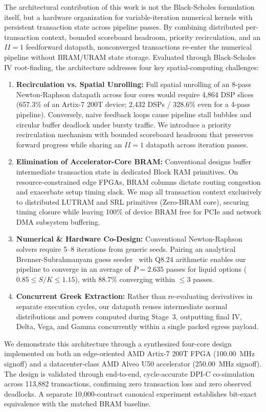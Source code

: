 \documentclass[sigconf,anonymous,review]{acmart}
\begin{document}
The architectural contribution of this work is not the Black-Scholes formulation itself, but a hardware organization for variable-iteration numerical kernels with persistent transaction state across pipeline passes. By combining distributed per-transaction context, bounded scoreboard headroom, priority recirculation, and an $II=1$ feedforward datapath, nonconverged transactions re-enter the numerical pipeline without BRAM/URAM state storage. Evaluated through Black-Scholes IV root-finding, the architecture addresses four key spatial-computing challenges:
\begin{enumerate}
    \item \textbf{Recirculation vs. Spatial Unrolling:} Full spatial unrolling of an 8-pass Newton-Raphson datapath across four cores would require 4,864 DSP slices (657.3\% of an Artix-7 200T device; 2,432 DSPs / 328.6\% even for a 4-pass pipeline). Conversely, naive feedback loops cause pipeline stall bubbles and circular buffer deadlock under bursty traffic. We introduce a priority recirculation mechanism with bounded scoreboard headroom that preserves forward progress while sharing an $II=1$ datapath across iteration passes.
    \item \textbf{Elimination of Accelerator-Core BRAM:} Conventional designs buffer intermediate transaction state in dedicated Block RAM primitives. On resource-constrained edge FPGAs, BRAM columns dictate routing congestion and exacerbate setup timing slack. We map all transaction context exclusively to distributed LUTRAM and SRL primitives (Zero-BRAM core), securing timing closure while leaving 100\% of device BRAM free for PCIe and network DMA subsystem buffering.
    \item \textbf{Numerical \& Hardware Co-Design:} Conventional Newton-Raphson solvers require 5--8 iterations from generic seeds. Pairing an analytical Brenner-Subrahmanyam guess seeder~\cite{brenner1988simple} with Q8.24 arithmetic enables our pipeline to converge in an average of $\bar{P} = 2.635$ passes for liquid options ($0.85 \le S/K \le 1.15$), with 88.7\% converging within $\le 3$ passes.
    \item \textbf{Concurrent Greek Extraction:} Rather than re-evaluating derivatives in separate execution cycles, our datapath reuses intermediate normal distributions and powers computed during Stage~3, outputting final IV, Delta, Vega, and Gamma concurrently within a single packed egress payload.
\end{enumerate}

We demonstrate this architecture through a synthesized four-core design implemented on both an edge-oriented AMD Artix-7 200T FPGA (100.00~MHz signoff) and a datacenter-class AMD Alveo U50 accelerator (250.00~MHz signoff). The design is validated through end-to-end, cycle-accurate DPI-C co-simulation across 113,882 transactions, confirming zero transaction loss and zero observed deadlocks. A separate 10,000-contract canonical experiment establishes bit-exact equivalence with the matched BRAM baseline.
\end{document}
